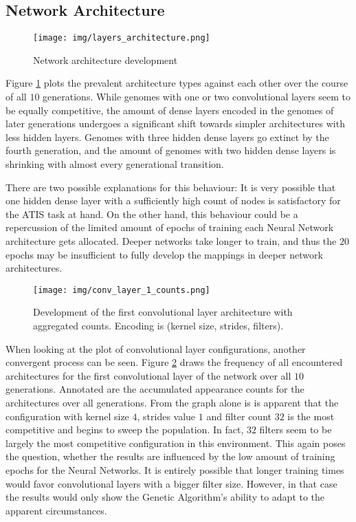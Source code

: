 \documentclass[11pt,a4paper,twoside,openright]{scrbook}
\begin{document}
\subsection{Network Architecture}

\begin{figure}[h]
  \centering
  \texttt{[image: img/layers\_architecture.png]}
  \caption{Network architecture development}
  \label{fig:layerarchitecture}
\end{figure}

Figure \ref{fig:layerarchitecture} plots the prevalent architecture types against each other over the course of all \(10\) generations. While genomes with one or two convolutional layers seem to be equally competitive, the amount of dense layers encoded in the genomes of later generations undergoes a significant shift towards simpler architectures with less hidden layers.
Genomes with three hidden dense layers go extinct by the fourth generation, and the amount of genomes with two hidden dense layers is shrinking with almost every generational transition.

There are two possible explanations for this behaviour: It is very possible that one hidden dense layer with a sufficiently high count of nodes is satisfactory for the ATIS task at hand. On the other hand, this behaviour could be a repercussion of the limited amount of epochs of training each Neural Network architecture gets allocated. Deeper networks take longer to train, and thus the \(20\) epochs may be insufficient to fully develop the mappings in deeper network architectures.

\begin{figure}[ht]
  \centering
  \texttt{[image: img/conv\_layer\_1\_counts.png]}
  \caption{Development of the first convolutional layer architecture with aggregated counts. Encoding is (kernel size, strides, filters).}
  \label{fig:layer1counts}
\end{figure}

\bigskip
When looking at the plot of convolutional layer configurations, another convergent process can be seen. Figure \ref{fig:layer1counts} draws the frequency of all encountered architectures for the first convolutional layer of the network over all \(10\) generations. Annotated are the accumulated appearance counts for the architectures over all generations. From the graph alone is is apparent that the configuration with kernel size \(4\), strides value \(1\) and filter count \(32\) is the most competitive and begins to sweep the population. In fact, \(32\) filters seem to be largely the most competitive configuration in this environment. This again poses the question, whether the results are influenced by the low amount of training epochs for the Neural Networks. It is entirely possible that longer training times would favor convolutional layers with a bigger filter size. However, in that case the results would only show the Genetic Algorithm's ability to adapt to the apparent circumstances.
\end{document}
